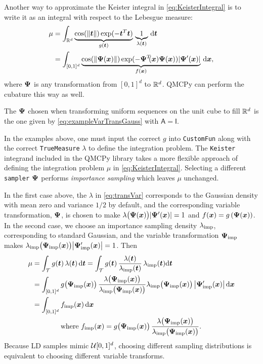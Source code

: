 \documentclass[graybox,footinfo]{svmult}
\newcommand{\QMCPYabs}[1]{\ensuremath{{\left \lvert #1 \right \rvert}}}
\newcommand{\IMP}{\textup{imp}}
\newcommand{\mA}{\mathsf{A}}
\newcommand{\mI}{\mathsf{I}}
\newcommand{\cube}{[0,1]^d}
\begin{document}
Another way to approximate the Keister integral in \eqref{eq:KeisterIntegral} is to write it as an integral with respect to the Lebesgue measure:
\begin{align*} 
	\mu 
	& = \int_{\bbR^d} \underbrace{\cos(\lVert \bst \rVert) \exp(-\bst^T \bst) }_{g(\bst)} \, \underbrace{1}_{\lambda(\bst)} \,\D \bst \\
	& = \int_{[0,1]^d} \underbrace{\cos(\lVert \bsPsi(\bsx) \rVert) \exp(-\bsPsi^T\!\!(\bsx) \bsPsi(\bsx)) \QMCPYabs{\bsPsi'(\bsx)}  }_{f(\bsx)} \, \D \bsx,
\end{align*}
where ${\boldsymbol{\Psi}}$ is any transformation from $[0,1]^d$ to ${\mathbb{R}}^d$.  QMCPy can perform the cubature this way as well.

The ${\boldsymbol{\Psi}}$ chosen when transforming uniform sequences on the unit cube to fill ${\mathbb{R}}^d$ is the one given by \eqref{eq:exampleVarTransGauss} with $\mA = \mI$.

In the examples above, one must input the correct $g$ into \texttt{CustomFun} along with the correct \texttt{TrueMeasure} $\lambda$ to define the integration problem. The \texttt{Keister} integrand included in the QMCPy library takes a more flexible approach of defining the integration problem $\mu$ in \eqref{eq:KeisterIntegral}. Selecting a different \texttt{sampler} ${\boldsymbol{\Psi}}$ performs  \emph{importance sampling} which leaves $\mu$ unchanged.  


In the first case above, the $\lambda$ in \eqref{eq:transVar} corresponds to the Gaussian density  with mean zero and variance $1/2$ by default, and the corresponding variable transformation, ${\boldsymbol{\Psi}}$, is chosen to make $\lambda\bigl(\bsPsi(\bsx)\bigr) \QMCPYabs{\bsPsi'(\bsx)}  = 1$ and $f({\boldsymbol{x}}) = g\left({\boldsymbol{\Psi}}({\boldsymbol{x}}) \right)$.  In the second case,  we choose an importance sampling density $\lambda_{\IMP}$, corresponding  to standard  Gaussian, and the variable transformation $\bsPsi_{\IMP}$ makes $\lambda_\IMP\bigl(\bsPsi_{\IMP}(\bsx)\bigr) \QMCPYabs{\bsPsi'_{\IMP}(\bsx)}  = 1$.  Then
\begin{align}
	\nonumber 
	\mu &= \int_\calT g(\bst) \, \lambda(\bst) \, \D \bst  = \int_\calT g(\bst) \, \frac{\lambda(\bst)}{\lambda_\IMP(\bst) } \, \lambda_\IMP(\bst) \D \bst  \\ 
	\nonumber
	& =  \int_{\cube} g\bigl(\bsPsi_\IMP(\bsx)\bigr) \, \frac{\lambda\bigl(\bsPsi_\IMP(\bsx)\bigr)} {\lambda_\IMP\bigl(\bsPsi_\IMP(\bsx)\bigr) } \lambda_\IMP\bigl(\bsPsi_\IMP(\bsx)\bigr) \,\QMCPYabs{\bsPsi'_{\IMP}(\bsx)}  \, \D \bsx \\
	\nonumber
	& =  \int_{\cube} f_\IMP(\bsx) \, \D \bsx  \\
	\label{eq:transVarImp}
	& \qquad \qquad \text{where } f_\IMP(\bsx)  = g\bigl(\bsPsi_\IMP(\bsx)\bigr)  \,  \frac{\lambda\bigl(\bsPsi_\IMP(\bsx)\bigr)} {\lambda_\IMP\bigl(\bsPsi_\IMP(\bsx)\bigr) }.
\end{align}
Because LD samples mimic $\calU\cube$, choosing different sampling distributions is equivalent to choosing different variable transforms.
\end{document}
